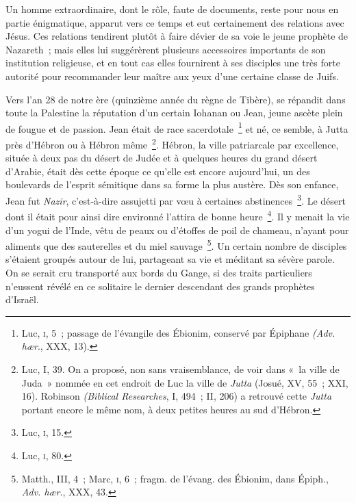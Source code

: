 \documentclass[french,twoside]{book} %
\newcommand\chaptercont{} %
\begin{document}
\chaptercont
\noindent Un homme extraordinaire, dont le rôle, faute de documents, reste pour nous en partie énigmatique, apparut vers ce temps et eut certainement des relations avec Jésus. Ces relations tendirent plutôt à faire dévier de sa voie le jeune prophète de Nazareth ; mais elles lui suggérèrent plusieurs accessoires importants de son institution religieuse, et en tout cas elles fournirent à ses disciples une très forte autorité pour recommander leur maître aux yeux d’une certaine classe de Juifs.\par
Vers l’an 28 de notre ère (quinzième année du règne de Tibère), se répandit dans toute la Palestine la réputation d’un certain Iohanan ou Jean, jeune ascète plein de fougue et de passion. Jean était de race sacerdotale \footnote{ Luc, \textsc{i}, 5 ; passage de l’évangile des Ébionim, conservé par Épiphane {\itshape (Adv. hær}., XXX, 13).} et né, ce semble, à Jutta près d’Hébron ou à Hébron même \footnote{ Luc, I, 39. On a proposé, non sans vraisemblance, de voir dans « la ville de Juda » nommée en cet endroit de Luc la ville de {\itshape Jutta} (Josué, XV, 55 ; XXI, 16). Robinson {\itshape (Biblical Researches}, I, 494 ; II, 206) a retrouvé cette {\itshape Jutta} portant encore le même nom, à deux petites heures au sud d’Hébron.}. Hébron, la ville patriarcale par excellence, située à deux pas du désert de Judée et à quelques heures du grand désert d’Arabie, était dès cette époque ce qu’elle est encore aujourd’hui, un des boulevards de l’esprit sémitique dans sa forme la plus austère. Dès son enfance, Jean fut {\itshape Nazir}, c’est-à-dire assujetti par vœu à certaines abstinences \footnote{ Luc, \textsc{i}, 15.}. Le désert dont il était pour ainsi dire environné l’attira de bonne heure \footnote{ Luc, \textsc{i}, 80.}. Il y menait la vie d’un yogui de l’Inde, vêtu de peaux ou d’étoffes de poil de chameau, n’ayant pour aliments que des sauterelles et du miel sauvage \footnote{ Matth., III, 4 ; Marc, \textsc{i}, 6 ; fragm. de l’évang. des Ébionim, dans Épiph., {\itshape Adv. hær}., XXX, 43.}. Un certain nombre de disciples s’étaient groupés autour de lui, partageant sa vie et méditant sa sévère parole. On se serait cru transporté aux bords du Gange, si des traits particuliers n’eussent révélé en ce solitaire le dernier descendant des grands prophètes d’Israël.\par
\end{document}
